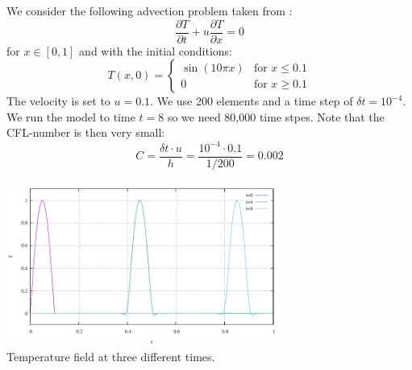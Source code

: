 

We consider the following advection problem taken from \cite[ex 5.2]{li06}:
\[
\frac{\partial T}{\partial t} + u \frac{\partial T}{\partial x} = 0
\]
for $x\in [0,1]$ and with the initial conditions:
\[
T(x,0)=
\left\{
\begin{array}{ll}
\sin (10 \pi x) & \textrm{for } x\leq 0.1 \\
0               & \textrm{for } x\geq 0.1 
\end{array}
\right.
\]
The velocity is set to $u=0.1$.
We use 200 elements and a time step of $\delta t=10^{-4}$. 
We run the model to time $t=8$ so we need 80,000 time stpes. 
Note that the CFL-number is then very small: 
\[
C = \frac{\delta t \cdot u}{h} = \frac{10^{-4} \cdot  0.1}{1/200} = 0.002
\]

\begin{center}
\includegraphics[width=9cm]{python_codes/fieldstone_60/results/T.pdf}\\
{\captionfont Temperature field at three different times.}
\end{center}




